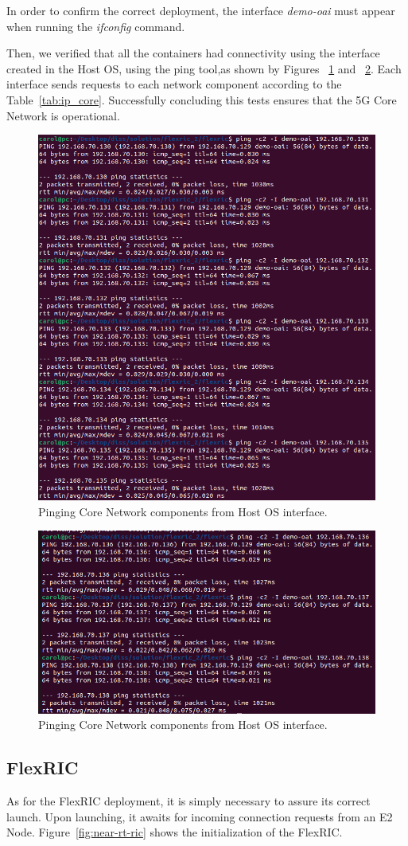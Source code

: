 In order to confirm the correct deployment, the interface \textit{demo-oai} must appear when running the \textit{ifconfig} command.

Then, we verified that all the containers had connectivity using the interface created in the Host OS, using the ping tool,as shown by Figures ~\ref{fig:ping_core1} and ~\ref{fig:ping_core2}.
Each interface sends requests to each network component according to the Table~\ref{tab:ip_core}.
Successfully concluding this tests ensures that the 5G Core Network is operational.

\begin{figure}[H]
\centering
\includegraphics[width=0.5\linewidth]{figures/ping_core_1}
\caption[Pinging Core Network components from Host OS
interface]{Pinging Core Network components from Host OS
interface.}
\label{fig:ping_core1}
\end{figure}

\begin{figure}[H]
    \centering
    \includegraphics[width=0.5\linewidth]{figures/ping_core_2}
    \caption[Pinging Core Network components from Host OS
    interface]{Pinging Core Network components from Host OS
    interface.}
    \label{fig:ping_core2}
\end{figure}




\subsection{FlexRIC}\label{subsec:flexric2}
As for the FlexRIC deployment, it is simply necessary to assure its correct launch.
Upon launching, it awaits for incoming connection requests from an E2 Node.
Figure~\ref{fig:near-rt-ric} shows the initialization of the FlexRIC\@.

